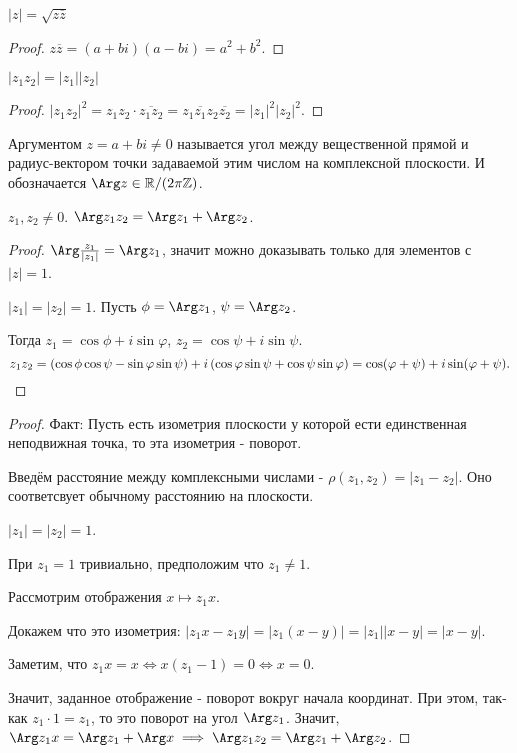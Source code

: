 \begin{statement} 
    $|z| = \sqrt{z \overline{z}} $ 
    \begin{proof} $z \overline{z} = (a+bi)(a-bi) = a^2+b^2$. \end{proof}
\end{statement}
\begin{statement} 
    $|z_1z_2| = |z_1| |z_2|$
    \begin{proof}
        $|z_1 z_2|^2 = z_1z_2 \cdot \overline{z_1 z_2} = z_1 \overline{z_1} z_2 \overline{z_2} = |z_1|^2|z_2|^2 $. \end{proof}
\end{statement}
\begin{definition} 
    Аргументом $z = a+bi \neq 0$ называется угол между вещественной прямой и радиус-вектором точки задаваемой этим числом на комплексной плоскости. И обозначается $\Arg z \in \mathbb{R}/(2\pi \mathbb{Z})$.
\end{definition}
\begin{statement} 
    $z_1, z_2 \neq 0$. $\Arg z_1z_2 = \Arg z_1 + \Arg z_2$.
    \begin{proof}
        $\Arg \frac{z_1}{|z_1|} = \Arg z_1$, значит можно доказывать только для элементов с $|z|=1$.

        $|z_1|=|z_2|=1$. Пусть $\phi = \Arg z_1$, $\psi = \Arg z_2$. 

        Тогда $z_1 =\cos \phi + i\sin \varphi$, $z_2 =\cos \psi + i\sin \psi$.
        \[ z_1z_2 = (\cos \phi \cos \psi -\sin \varphi\sin \psi) + i\left(\cos \varphi\sin \psi +\cos \psi\sin \varphi \right) =\cos (\varphi + \psi) + i\sin(\varphi + \psi)  .\qedhere\] 
    \end{proof}
    \begin{proof}
       Факт: Пусть есть изометрия плоскости у которой ести единственная неподвижная точка, то эта изометрия - поворот.

       Введём расстояние между комплексными числами - $\rho(z_1, z_2) = |z_1-z_2|$. Оно соответсвует обычному расстоянию на плоскости.

       $|z_1| = |z_2| = 1$.

       При $z_1 = 1$ тривиально, предположим что $z_1 \neq 1$.

       Рассмотрим отображения $x \mapsto z_1 x$.

       Докажем что это изометрия: $|z_1 x - z_1 y| = |z_1(x-y)| = |z_1| |x-y| = |x-y|$.

       Заметим, что $z_1 x = x \iff x(z_1-1) = 0 \iff x = 0$.

       Значит, заданное отображение - поворот вокруг начала координат. При этом, так-как $z_1 \cdot  1 = z_1$, то это поворот на угол $\Arg z_1$. Значит, $\Arg z_1 x = \Arg z_1 + \Arg x \implies \Arg z_1 z_2 = \Arg z_1 + \Arg z_2$.
    \end{proof}
\end{statement}

